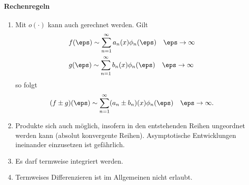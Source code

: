 \paragraph{Rechenregeln}
\label{sec:rechenregeln}
\begin{enumerate}
\item 
Mit $o(\cdot)$ kann auch gerechnet werden. Gilt 
\begin{align*}
  &f(\eps) \sim \sum_{n =1}^{\infty}a_{n}(x)\phi_{n}(\eps) \quad \eps \to \infty\\
  &g(\eps) \sim \sum_{n =1}^{\infty}b_{n}(x)\phi_{n}(\eps) \quad \eps \to \infty
\end{align*}
so folgt
\begin{align*}
    (f\pm g)(\eps) \sim \sum_{n =1}^{\infty}(a_{n}\pm b_{n})(x)\phi_{n}(\eps) \quad \eps \to \infty. 
\end{align*}
\item Produkte sich auch möglich, insofern in den entstehenden Reihen ungeordnet werden kann (absolut konvergente Reihen). Asymptotische Entwicklungen ineinander einzusetzen ist gefährlich. 
\item Es darf termweise integriert werden. 
\item Termweises Differenzieren ist im Allgemeinen nicht erlaubt. 
\end{enumerate}
